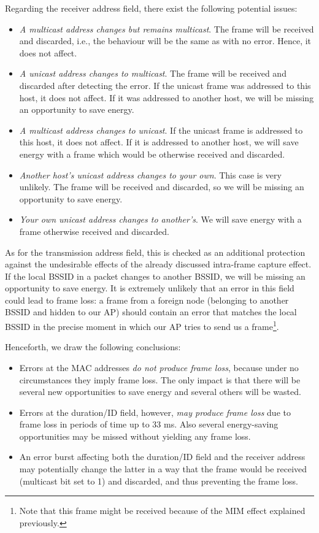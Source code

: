 \documentclass[twoside,nohyper]{tufte-book}
\providecommand{\tightlist}{%
  \setlength{\itemsep}{0pt}\setlength{\parskip}{0pt}}
\theoremstyle{definition}
\theoremstyle{definition}
\theoremstyle{definition}
\theoremstyle{remark}
\begin{document}
Regarding the receiver address field, there exist the following
potential issues:

\begin{itemize}
\tightlist
\item
  \emph{A multicast address changes but remains multicast}. The frame
  will be received and discarded, i.e., the behaviour will be the same
  as with no error. Hence, it does not affect.
\item
  \emph{A unicast address changes to multicast}. The frame will be
  received and discarded after detecting the error. If the unicast frame
  was addressed to this host, it does not affect. If it was addressed to
  another host, we will be missing an opportunity to save energy.
\item
  \emph{A multicast address changes to unicast}. If the unicast frame is
  addressed to this host, it does not affect. If it is addressed to
  another host, we will save energy with a frame which would be
  otherwise received and discarded.
\item
  \emph{Another host's unicast address changes to your own}. This case
  is very unlikely. The frame will be received and discarded, so we will
  be missing an opportunity to save energy.
\item
  \emph{Your own unicast address changes to another's}. We will save
  energy with a frame otherwise received and discarded.
\end{itemize}

As for the transmission address field, this is checked as an additional
protection against the undesirable effects of the already discussed
intra-frame capture effect. If the local BSSID in a packet changes to
another BSSID, we will be missing an opportunity to save energy. It is
extremely unlikely that an error in this field could lead to frame loss:
a frame from a foreign node (belonging to another BSSID and hidden to
our AP) should contain an error that matches the local BSSID in the
precise moment in which our AP tries to send us a frame\footnote{Note
  that this frame might be received because of the MIM effect explained
  previously.}.

Henceforth, we draw the following conclusions:

\begin{itemize}
\tightlist
\item
  Errors at the MAC addresses \emph{do not produce frame loss}, because
  under no circumstances they imply frame loss. The only impact is that
  there will be several new opportunities to save energy and several
  others will be wasted.
\item
  Errors at the duration/ID field, however, \emph{may produce frame
  loss} due to frame loss in periods of time up to 33 ms. Also several
  energy-saving opportunities may be missed without yielding any frame
  loss.
\item
  An error burst affecting both the duration/ID field and the receiver
  address may potentially change the latter in a way that the frame
  would be received (multicast bit set to 1) and discarded, and thus
  preventing the frame loss.
\end{itemize}
\end{document}
